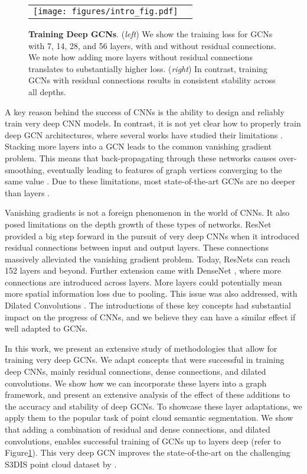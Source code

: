 \documentclass[10pt,twocolumn,letterpaper]{article}
\newcommand{\figLabel}{Figure\xspace}
\begin{document}
\begin{figure}[!t]
    \centering
    \begin{tabular}{cc}
    \texttt{[image: figures/intro\_fig.pdf]}
    \end{tabular}
    \caption{\textbf{Training Deep GCNs}. (\emph{left}) We show the training loss for GCNs with 7, 14, 28, and 56 layers, with and without residual connections. We note how adding more layers without residual connections translates to substantially higher loss. (\emph{right}) In contrast, training GCNs with residual connections results in consistent stability across all depths.}
    \label{fig:intro_fig}
\end{figure}

A key reason behind the success of CNNs is the ability to design and reliably train very deep CNN models. In contrast, it is not yet clear how to properly train deep GCN architectures, where several works have studied their limitations  \cite{li2018deeper,wu2019comprehensive,zhou2018graph}. Stacking more layers into a GCN leads to the common vanishing gradient problem. This means that back-propagating through these networks causes over-smoothing, eventually leading to features of graph vertices converging to the same value \cite{li2018deeper}. Due to these limitations, most state-of-the-art GCNs are no deeper than  layers \cite{zhou2018graph}.

Vanishing gradients is not a foreign phenomenon in the world of CNNs. It also posed limitations on the depth growth of these types of networks. ResNet \cite{he2016deep} provided a big step forward in the pursuit of very deep CNNs when it introduced residual connections between input and output layers. These connections massively alleviated the vanishing gradient problem. Today, ResNets can reach 152 layers and beyond. Further extension came with DenseNet \cite{huang2017densely}, where more connections are introduced across layers. More layers could potentially mean more spatial information loss due to pooling. This issue was also addressed, with Dilated Convolutions \cite{yu2015multi}. The introductions of these key concepts had substantial impact on the progress of CNNs, and we believe they can have a similar effect if well adapted to GCNs.

In this work, we present an extensive study of methodologies that allow for training very deep GCNs. We adapt concepts that were successful in training deep CNNs, mainly residual connections, dense connections, and dilated convolutions. We show how we can incorporate these layers into a graph framework, and present an extensive analysis of the effect of these additions to the accuracy and stability of deep GCNs. To showcase these layer adaptations, we apply them to the popular task of point cloud semantic segmentation. We show that adding a combination of residual and dense connections, and dilated convolutions, enables successful training of GCNs up to  layers deep (refer to \figLabel \ref{fig:intro_fig}). This very deep GCN improves the state-of-the-art on the challenging S3DIS \cite{2017arXiv170201105A} point cloud dataset by . 
\end{document}
